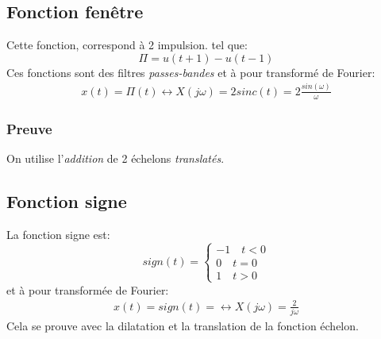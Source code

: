 \documentclass{report}
\begin{document}
\subsection{Fonction fenêtre} \label{window}
Cette fonction, correspond à 2 impulsion. tel que:
\begin{equation}
\Pi = u(t+1) - u(t-1)
\end{equation}
Ces fonctions sont des filtres \textit{passes-bandes} et à pour transformé de Fourier:
\begin{align*}
x(t) = \Pi (t) \longleftrightarrow X(j\omega) = 2 sinc(t) = 2\frac{sin(\omega)}{\omega}
\end{align*}

\subsubsection{Preuve}
On utilise l'\textit{addition} de 2 échelons \textit{translatés}.

\subsection{Fonction signe}
La fonction signe est:
\begin{equation}
sign(t) = \begin{cases}
-1 \quad t < 0\\
0 \quad t = 0\\
1 \quad t > 0
\end{cases}
\end{equation}
et à pour transformée de Fourier:
\begin{align*}
x(t) = sign(t) = \longleftrightarrow X(j\omega) = \frac{2}{j\omega}
\end{align*}
Cela se prouve avec la dilatation et la translation de la fonction échelon.
\end{document}
